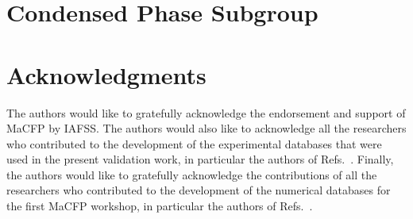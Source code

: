 \documentclass[review,11pt]{elsarticle}
\begin{document}












\section{Condensed Phase Subgroup} \label{sec:CPS_session}







\section*{Acknowledgments} \label{sec:ack}

The authors would like to gratefully acknowledge the endorsement  and support of MaCFP by IAFSS. The authors would also like to acknowledge all the researchers who contributed to the development of the experimental databases that were used in the present validation work, in particular the authors of Refs.~\cite{Case1_EXP,Case2a_EXP,Case2b_EXP_CH4,Case2b_EXP_H2,Case3_EXP_1,Case3_EXP_2,Case4_EXP_1,Case4_EXP_2,Case5_EXP_1,Case5_EXP_2,Case5_EXP_3}. Finally, the authors would like to gratefully acknowledge the contributions of all the researchers who contributed to the development of the numerical databases for the first MaCFP workshop, in particular the authors of Refs.~\cite{Case1_SIM_IRSN,Case1_SIM_NIST,Case1_SIM_UGent,Case2a_SIM_FMG,Case2a_SIM_UGent,Case2a_SIM_IRSN,Case2a_SIM_NIST,Case2b_SIM_UGent,Case2b_SIM_NIST,Case2b_SIM_SNL,Case2b_SIM_UCantabria,Case3_SIM_UGent,Case3_SIM_UMD,Case3_SIM_VTT,Case4_SIM_NIST,Case4_SIM_FMG,Case5_SIM_FMG,Case5_SIM_NIST,Case5_SIM_UMD}.


\end{document}
